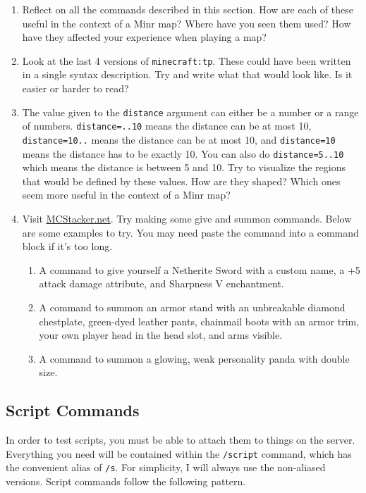 \documentclass[oneside]{book}
\newenvironment{thinkbox}{%
    \begin{tcolorbox}[title=Stop and Think]%
    }{
    \end{tcolorbox}
    }
\begin{document}
\begin{thinkbox}
\begin{enumerate}
    \item Reflect on all the commands described in this section. How are each of these useful in the context of a Minr map? Where have you seen them used? How have they affected your experience when playing a map?
    \item Look at the last 4 versions of \texttt{minecraft:tp}. These could have been written in a single syntax description. Try and write what that would look like. Is it easier or harder to read?
    \item The value given to the \texttt{distance} argument can either be a number or a range of numbers. \texttt{distance=..10} means the distance can be at most 10, \texttt{distance=10..} means the distance can be at most 10, and \texttt{distance=10} means the distance has to be exactly 10. You can also do \texttt{distance=5..10} which means the distance is between 5 and 10. Try to visualize the regions that would be defined by these values. How are they shaped? Which ones seem more useful in the context of a Minr map?
    \item Visit \href{https://mcstacker.net/}{MCStacker.net}. Try making some give and summon commands. Below are some examples to try. You may need paste the command into a command block if it's too long.
    \begin{enumerate}
        \item A command to give yourself a Netherite Sword with a custom name, a +5 attack damage attribute, and Sharpness V enchantment.
        \item A command to summon an armor stand with an unbreakable diamond chestplate, green-dyed leather pants, chainmail boots with an armor trim, your own player head in the head slot, and arms visible.
        \item A command to summon a glowing, weak personality panda with double size.
    \end{enumerate}
    
\end{enumerate}
\end{thinkbox}

\subsection{Script Commands} \label{subsec:script-commands}

In order to test scripts, you must be able to attach them to things on the server. Everything you need will be contained within the \texttt{/script} command, which has the convenient alias of \texttt{/s}. For simplicity, I will always use the non-aliased versions. Script commands follow the following pattern.
\end{document}
